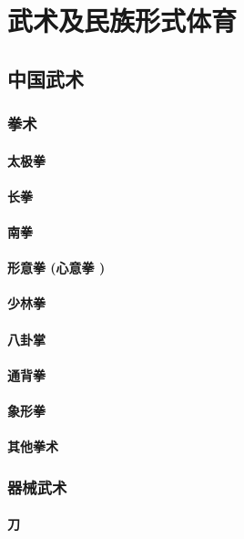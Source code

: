 \documentclass[UTF8]{../../ApplicationUniverse}
\begin{document}
\chapter{武术及民族形式体育}
\section{中国武术}
    \subsection{拳术}
        \subsubsection{太极拳}
        \subsubsection{长拳}
        \subsubsection{南拳}
        \subsubsection{形意拳 (心意拳 )}
        \subsubsection{少林拳}
        \subsubsection{八卦掌}
        \subsubsection{通背拳}
        \subsubsection{象形拳}
        \subsubsection{其他拳术}
    \subsection{器械武术}
        \subsubsection{刀}
\end{document}
